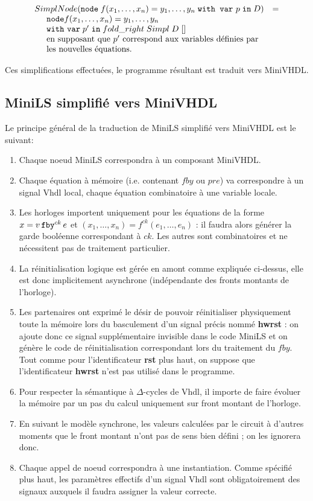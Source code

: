 \documentclass[a4paper]{article}
\newcommand{\minils}{{\sc MiniLS}}
\newcommand{\minivhdl}{{\sc MiniVHDL}}
\newcommand{\vhdl}{{\sc Vhdl}}
\newcommand{\mybox}[1]{\mbox{\tt{#1}}}
\newcommand{\ind}[0]{\hspace{0.5cm}}
\newcommand{\Node}[4]{\mybox{node} \; f(#1) = #2 \; \mybox{with var} \
  #3 \; \mybox{in} \; #4}
\newcommand{\Fby}[2]{#1 \, \mybox{fby}^{ck} \, #2}
\newcommand{\App}[2]{#1^{ck}(#2)}
\begin{document}
\[
\begin{array}{ll}
  \simplnd{\Node{x_1,\dots,x_n}{y_1,\dots,y_n}{p}{D}} & = \\
  \ind \mathtt{node} f(x_1,\dots,x_n) = y_1, \dots, y_n \; \\
  \ind \mathtt{with} \  \mathtt{var} \; p' \; \mathtt{in} \; fold\_right \;Simpl
  \; D \; [] \\
  \ind \mbox{en supposant que $p'$ correspond
             aux variables définies par} \\ \ind \mbox{les nouvelles équations.}
\end{array}
\]

Ces simplifications effectuées, le programme résultant est traduit vers \minivhdl.

\subsection{MiniLS simplifié vers MiniVHDL}

Le principe général de la traduction de \minils{} simplifié vers \minivhdl{} est le
suivant:

\begin{enumerate}
\item Chaque noeud \minils{} correspondra à un composant \minivhdl.
\item Chaque équation à mémoire (i.e. contenant $fby$ ou $pre$) va correspondre
  à un signal \vhdl{} local, chaque équation combinatoire à une variable locale.
\item Les horloges importent uniquement pour les équations de la forme $x =
  \Fby{v}{e}$ et $(x_1,\dots,x_n) = \App{f}{e_1,\dots,e_n}$ : il faudra alors
  générer la garde booléenne correspondant à $ck$. Les autres sont combinatoires
  et ne nécessitent pas de traitement particulier.
\item La réinitialisation logique est gérée en amont comme expliquée ci-dessus,
  elle est donc implicitement asynchrone (indépendante des fronts montants de
  l'horloge).
\item Les partenaires ont exprimé le désir de pouvoir réinitialiser
  physiquement toute la mémoire lors du basculement d'un signal précis
  nommé \textbf{hwrst} : on ajoute donc ce signal supplémentaire
  invisible dans le code \minils{} et on génère le code de
  réinitialisation correspondant lors du traitement du $fby$. Tout
  comme pour l'identificateur \textbf{rst} plus haut, on suppose que
  l'identificateur \textbf{hwrst} n'est pas utilisé dans le programme.
\item Pour respecter la sémantique à $\Delta$-cycles de \vhdl{}, il importe de
  faire évoluer la mémoire par un pas du calcul uniquement sur front montant de
  l'horloge.
\item En suivant le modèle synchrone, les valeurs calculées par le circuit à
  d'autres moments que le front montant n'ont pas de sens bien défini ; on les
  ignorera donc.
\item Chaque appel de noeud correspondra à une instantiation. Comme spécifié
  plus haut, les paramètres effectifs d'un signal \vhdl{} sont obligatoirement des
  signaux auxquels il faudra assigner la valeur correcte.
\end{enumerate}
\end{document}
